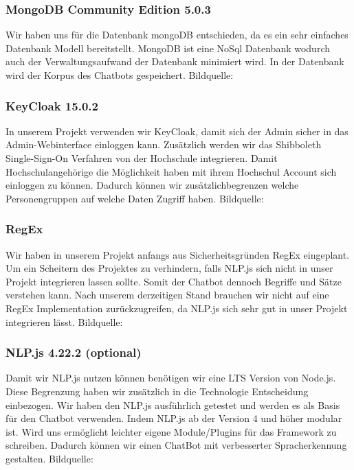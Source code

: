 \subsubsection{MongoDB Community Edition 5.0.3}
Wir haben uns für die Datenbank mongoDB entschieden, da es ein sehr einfaches Datenbank Modell bereitstellt.
MongoDB ist eine NoSql Datenbank wodurch auch der Verwaltungsaufwand der Datenbank minimiert wird.
In der Datenbank wird der Korpus des Chatbots gespeichert.
Bildquelle:\cite{mongodbicon}

\subsubsection{KeyCloak 15.0.2}
In unserem Projekt verwenden wir KeyCloak, damit sich der Admin sicher in das Admin-Webinterface einloggen kann.
Zusätzlich werden wir das Shibboleth Single-Sign-On Verfahren von der Hochschule integrieren.
Damit Hochschulangehörige die Möglichkeit haben mit ihrem Hochschul Account sich einloggen zu können.
Dadurch können wir zusätzlichbegrenzen welche Personengruppen auf welche Daten Zugriff haben.
Bildquelle:\cite{keycloakicon}

\subsubsection{RegEx}
Wir haben in unserem Projekt anfangs aus Sicherheitsgründen RegEx eingeplant.
Um ein Scheitern des Projektes zu verhindern, falls NLP.js sich nicht in unser Projekt integrieren lassen sollte.
Somit der Chatbot dennoch Begriffe und Sätze verstehen kann.
Nach unserem derzeitigen Stand brauchen wir nicht auf eine RegEx Implementation zurückzugreifen,
da NLP.js sich sehr gut in unser Projekt integrieren lässt.
Bildquelle:\cite{regexicon}

\subsubsection{NLP.js 4.22.2 (optional)}
Damit wir NLP.js nutzen können benötigen wir eine LTS Version von Node.js.
Diese Begrenzung haben wir zusätzlich in die Technologie Entscheidung einbezogen.
Wir haben den NLP.js ausführlich getestet und werden es als Basis für den Chatbot verwenden.
Indem NLP.js ab der Version 4 und höher modular ist. Wird uns ermöglicht leichter eigene Module/Plugins
für das Framework zu schreiben.
Dadurch können wir einen ChatBot mit verbesserter Spracherkennung gestalten.
Bildquelle:\cite{nlpicon}